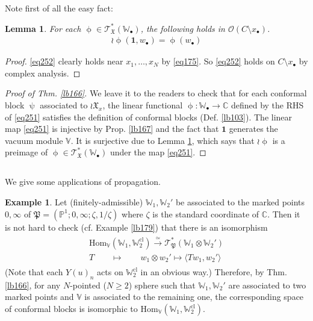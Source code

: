 \documentclass[12pt,a4paper,notitlepage]{article}
\theoremstyle{definition}
\newtheorem{eg}[df]{Example}
\theoremstyle{plain}
\newtheorem{lm}[df]{Lemma}
\newcommand{\fk}{\mathfrak}
\newcommand{\id}{\mathbf{1}}
\newcommand{\Hom}{\mathrm{Hom}}
\newcommand{\bk}[1]{\langle {#1}\rangle}
\newcommand{\scr}{\mathscr}
\newcommand{\blt}{\bullet}
\newcommand{\Vbb}{\mathbb V}
\newcommand{\Wbb}{\mathbb W}
\newcommand{\Cbb}{\mathbb C}
\newcommand{\Pbb}{\mathbb P}
\newcommand{\cl}{\mathrm{cl}}
\numberwithin{equation}{section}
\begin{document}
Note first of all the easy fact:

\begin{lm}\label{lb168}
For each $\upphi\in\scr T_{\fk X}^*(\Wbb_\blt)$, the following holds in $\scr O(C\setminus x_\blt)$.
\begin{align}
\wr\upphi(\id,w_\blt)=\upphi(w_\blt)\label{eq252}
\end{align}
\end{lm}
\begin{proof}
\eqref{eq252} clearly holds near $x_1,\dots,x_N$ by \eqref{eq175}. So \eqref{eq252} holds on $C\setminus x_\blt$ by complex analysis.
\end{proof}

\begin{proof}[Proof of Thm. \ref{lb166}]
We leave it to the readers to check that for each conformal block $\uppsi$ associated to $\wr\fk X_x$, the linear functional $\upphi:\Wbb_\blt\rightarrow\Cbb$ defined by the RHS of \eqref{eq251} satisfies the definition of conformal blocks (Def. \ref{lb103}). The linear map \eqref{eq251} is injective by Prop. \ref{lb167} and the fact that $\id$ generates the vacuum module $\Vbb$. It is surjective due to Lemma \ref{lb168}, which says that $\wr\upphi$ is a preimage of $\upphi\in\scr T_{\fk X}^*(\Wbb_\blt)$ under the map \eqref{eq251}.
\end{proof}


\subsection{}\label{lb182}

We give some applications of propagation.
\begin{eg}\label{lb177}
Let (finitely-admissible) $\Wbb_1,\Wbb_2'$ be associated to the marked points $0,\infty$ of $\fk P=(\Pbb^1;0,\infty;\zeta,1/\zeta)$ where $\zeta$ is the standard coordinate of $\Cbb$. Then it is not hard to check (cf. Example \ref{lb179}) that there is an isomorphism
\begin{gather}
\begin{gathered}
\Hom_\Vbb(\Wbb_1,\Wbb_2^\cl)\xrightarrow{\simeq} \scr T_{\fk P}^*(\Wbb_1\otimes\Wbb_2')\\
T\qquad\mapsto\qquad \boxed{w_1\otimes w_2'\mapsto\bk{T w_1,w_2'}}
\end{gathered}
\end{gather}
(Note that each $Y(u)_n$ acts on $\Wbb_2^\cl$ in an obvious way.) Therefore, by Thm. \ref{lb166}, for any $N$-pointed ($N\geq 2$) sphere such that $\Wbb_1,\Wbb_2'$ are associated to two marked points and $\Vbb$ is associated to the remaining one, the corresponding space of conformal blocks is isomorphic to $\Hom_\Vbb(\Wbb_1,\Wbb_2^\cl)$.
\end{eg}
\end{document}
